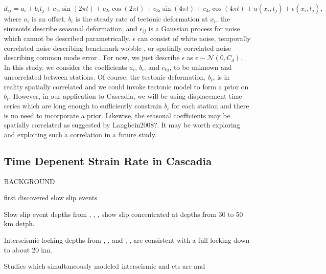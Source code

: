 \documentclass[10pt,a4paper]{article}
\begin{document}
\begin{equation}\label{eq:Data}
d_{ij} = a_{i} + b_{i} t_j + c_{1i}\sin(2 \pi t) + c_{2i}\cos(2 \pi t) + c_{3i}\sin(4 \pi t) + c_{4i}\cos(4 \pi t) + u(x_i,t_j) + \epsilon(x_i,t_j),
\end{equation}
where $a_i$ is an offset, $b_i$ is the steady rate of tectonic deformation at $x_i$, the sinusoids describe seasonal deformation, and $\epsilon_{ij}$ is a Gaussian process for noise which cannot be described parametrically. $\epsilon$ can consist of white noise, temporally correlated noise describing benchmark wobble \citep[e.g.,][]{Wyatt1982,Wyatt1989}, or spatially correlated noise describing common mode error \citep[e.g.,][]{Wdowinski1997}.  For now, we just describe $\epsilon$ as $\epsilon \sim \mathcal{N}(0,C_d)$.  In this study, we consider the coefficients $a_{i}$, $b_{i}$, and $c_{kj}$, to be unknown and uncorrelated between stations. Of course, the tectonic deformation, $b_i$, is in reality spatially correlated and we could invoke tectonic model to form a prior on $b_i$. However, in our application to Cascadia, we will be using displacement time series which are long enough to sufficiently constrain $b_i$ for each station and there is no need to incorporate a prior. Likewise, the seasonal coefficients may be spatially correlated as suggested by Langbein2008?. It may be worth exploring and exploiting such a correlation in a future study.       
     

\subsection{Time Depenent Strain Rate in Cascadia}\label{sec:ApplicationsCascadia}

BACKGROUND

\citet{Dragert2001} first discovered slow slip events

Slow slip event depths from \citet{Dragert2001}, \citet{Wech2009}, \citet{Schmidt2010}, \citet{Bartlow2011} show slip concentrated at depths from 30 to 50 km detph.
 
Interseismic locking depths from \citet{Fluck1997}, \citet{Murray2000}, \citet{McCaffrey2007} and \citet{McCaffrey2013}, \citet{Burgette2009}, \citet{schmalzle2014} are consistent with a full locking down to about 20 km.

Studies which simultaneously modeled interseismic and ets are \citet{Holtkamp2010} and \citet{schmalzle2014}
\end{document}
